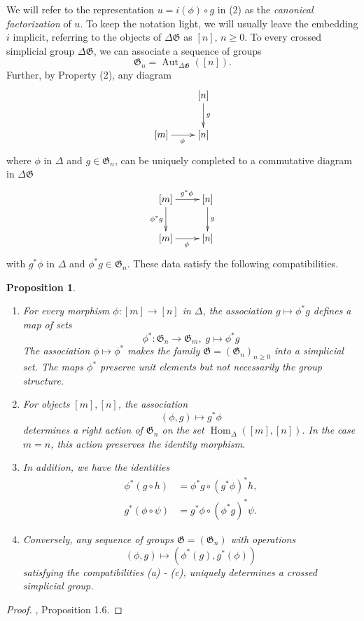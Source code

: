 \documentclass[english,11pt,leqno]{article}
\def\Gen{\mathfrak{G}}
\def\Aut{\operatorname{Aut}\nolimits}
\def\Hom{\operatorname{Hom}}
\def\lra{\longrightarrow}
\def\Hom{\operatorname{Hom}}
\def\DG{ {\Delta \Gen}}
\newtheorem{prop}[thm]{Proposition}
\theoremstyle{definition}
\theoremstyle{remark}
\numberwithin{equation}{section}
\begin{document}
We will refer to the representation $u=i(\phi) \circ g$ in (2) as the {\em canonical factorization}
of $u$. To keep the notation light, we will usually leave the embedding $i$ implicit, 
referring to the objects of $\Delta \Gen$ as $[n]$, $n\geq 0$.
To every crossed simplicial group $\Delta \Gen$, we can associate a sequence of groups
\begin{equation}\label{eq:crossed}
	\Gen_n = \Aut_{\Delta\Gen}([n]). 
\end{equation}
Further, by Property (2), any diagram
\[
	\xymatrix{ & [n]\ar[d]^{g} \\ [m] \ar[r]_{\phi} & [n]}
\]
where $\phi$ in $\Delta$ and $g \in \Gen_n$, can be uniquely completed to a commutative diagram in
$\DG$
\begin{equation}
	\label{eq:can-square}
	\xymatrix{ [m]\ar[d]_{\phi^*g} \ar[r]^{g^*\phi} & [n]\ar[d]^{g} \\ [m] \ar[r]_{\phi} & [n]}
\end{equation}
with $g^*\phi$ in $\Delta$ and $\phi^* g \in \Gen_n$. These data satisfy the following
compatibilities.

\begin{prop}\label{prop:skeleton}
	\begin{enumerate}[label=(\alph*)]
		\item For every morphism $\phi: [m] \to [n]$ in $\Delta$, the association
		$g\mapsto \phi^* g$ defines a
		 map of sets
			\[
				\phi^*: \Gen_n \lra \Gen_m,\; g \mapsto \phi^*g
			\]
		The association $\phi \mapsto \phi^*$ makes the family $\Gen=(\Gen_n)_{n\geq 0}$ 
		into a simplicial set. The maps $\phi^*$ preserve unit elements but not necessarily the group structure.

		\item For objects $[m],[n]$, the association
			\[
				(\phi,g) \mapsto g^*\phi
			\]
			determines a right action of $\Gen_n$ on the set $\Hom_{\Delta}([m],[n])$. 
			In the case $m=n$, this action preserves the identity morphism.

		\item In addition, we have the identities
			\begin{align*}
			\phi^*(g \circ h) & = \phi^*g \circ (g^*\phi)^*h,\\
			g^*(\phi \circ \psi) & = g^*\phi \circ (\phi^*g)^*\psi.
			\end{align*}
			
			\item Conversely, any sequence of groups $\Gen=(\Gen_n)$
	with operations
	\[
	(\phi,g) \mapsto (\phi^*(g),g^*(\phi))
	\]
	satisfying the compatibilities  (a) - (c),  uniquely determines a
	crossed simplicial group.  

			
	\end{enumerate}
\end{prop}	
\begin{proof}\cite{fiedorowicz-loday}, Proposition 1.6.\end{proof}
\end{document}
